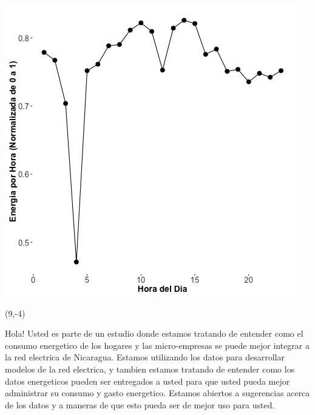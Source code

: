 \documentclass{article}\usepackage[]{graphicx}\usepackage[]{color}
\newenvironment{knitrout}{}{} %
\begin{document}
\begin{knitrout}
\color{fgcolor}
\includegraphics[scale=0.75]{figure/A25_fplot_norm_median} 
\end{knitrout}

 \begin{textblock}{1}(9,-4)
\begin{minipage}{20em}
\begingroup

\endgroup
\end{minipage}
\end{textblock}

\vspace{70px}
\begin{knitrout}
Hola! Usted es parte de un estudio donde estamos tratando de entender como el consumo energetico de los hogares y las micro-empresas se puede mejor integrar a la red electrica de Nicaragua. Estamos utilizando los datos para desarrollar modelos de la red electrica, y tambien estamos tratando de entender como los datos energeticos pueden ser entregados a usted para que usted pueda mejor administrar su consumo y gasto energetico.  Estamos abiertos a sugerencias acerca de los datos y a maneras de que esto pueda ser de mejor uso para usted.
\end{knitrout}
\end{document}
